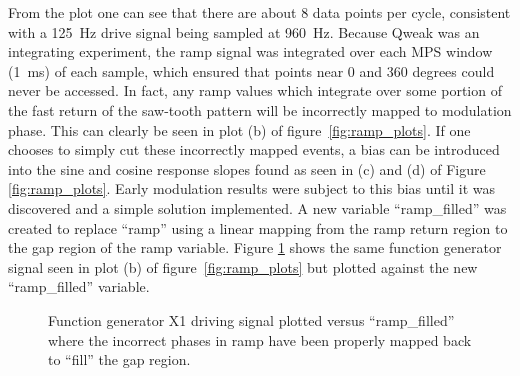 From the plot one can see that there are about 8 data points per cycle, consistent with a 125~Hz drive signal being sampled at 960~Hz. Because Qweak was an integrating experiment, the ramp signal was integrated over each MPS window (1~ms) of each sample, which ensured that points near 0 and 360 degrees could never be accessed. In fact, any ramp values which integrate over some portion of the fast return of the saw-tooth pattern will be incorrectly mapped to modulation phase. This can clearly be seen in plot (b) of  figure~\ref{fig:ramp_plots}. If one chooses to simply cut these incorrectly mapped events, a bias can be introduced into the sine and cosine response slopes found as seen in (c) and (d) of Figure \ref{fig:ramp_plots}. Early modulation results were subject to this bias until it was discovered and a simple solution implemented. A new variable ``ramp\_filled'' was created to replace ``ramp'' using a linear mapping from the ramp return region to the gap region of the ramp variable. Figure \ref{fig:ramp_filled} shows the same function generator signal seen in plot (b) of figure~\ref{fig:ramp_plots} but plotted against the new ``ramp\_filled'' variable.

\begin{figure}[ht]

\centering
{}
\caption {Function generator X1 driving signal plotted versus ``ramp\_filled'' where the incorrect phases in ramp have been properly mapped back to ``fill'' the gap region.}
\label{fig:ramp_filled}
\end{figure}

